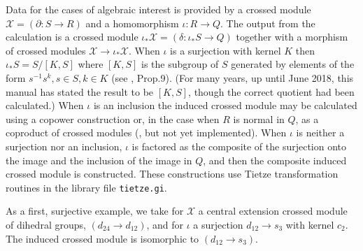 \documentclass[a4paper,11pt]{report}
\newcommand{\calX}{\mathcal{X}}
\begin{document}
{{{ Data for the cases of algebraic interest is provided by a crossed module $\calX = (\partial : S \to R)$ and a homomorphism $\iota : R \to Q$. The output from the calculation is a crossed module $\iota_{\ast}\calX = (\delta : \iota_{\ast}S \to Q)$ together with a morphism of crossed modules $\calX \to \iota_{\ast}\calX$. When $\iota$ is a surjection with kernel $K$ then $\iota_{\ast}S = S/[K,S]$ where $[K,S]$ is the subgroup of $S$ generated by elements of the form $s^{-1}s^k, s \in S, k \in K$ (see \cite{BH1}, Prop.9). (For many years, up until June 2018, this manual has stated the
result to be $[K,S]$, though the correct quotient had been calculated.) When $\iota$ is an inclusion the induced crossed module may be calculated using a copower
construction \cite{BW1} or, in the case when $R$ is normal in $Q$, as a coproduct of crossed modules (\cite{BW2}, but not yet implemented). When $\iota$ is neither a surjection nor an inclusion, $\iota$ is factored as the composite of the surjection onto the image and the
inclusion of the image in $Q$, and then the composite induced crossed module is constructed. These
constructions use Tietze transformation routines in the library file \texttt{tietze.gi}. 

 As a first, surjective example, we take for $\calX$ a central extension crossed module of dihedral groups, $(d_{24} \to d_{12})$, and for $\iota$ a surjection $d_{12} \to s_3$ with kernel $c_2$. The induced crossed module is isomorphic to $(d_{12} \to s_3)$. }

 

 
\begin{Verbatim}[commandchars=!@|,fontsize=\small,frame=single,label=Example]
  

\end{Verbatim}}}
\end{document}
